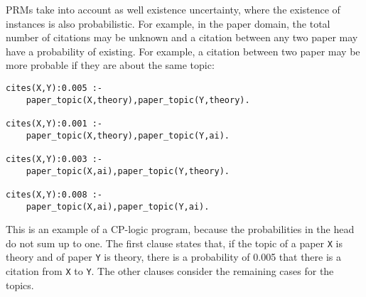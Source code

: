 \documentclass{article}
\begin{document}
PRMs take into account as well existence uncertainty, where the existence of instances is also probabilistic. For example, in the paper domain, the total number of citations may be unknown and  a citation between any two paper may have a probability of existing. For example, a citation between two paper may be more probable if they are about the same topic:
\begin{verbatim}
cites(X,Y):0.005 :- 
    paper_topic(X,theory),paper_topic(Y,theory).

cites(X,Y):0.001 :- 
    paper_topic(X,theory),paper_topic(Y,ai).

cites(X,Y):0.003 :- 
    paper_topic(X,ai),paper_topic(Y,theory).

cites(X,Y):0.008 :- 
    paper_topic(X,ai),paper_topic(Y,ai).
\end{verbatim}
This is an example of a CP-logic program, because the probabilities in the head do not sum up to one.
The first clause states that, if the topic of a paper \texttt{X} is theory and  of  paper \texttt{Y} is theory, there is a probability of 0.005 that there is a citation from \texttt{X} to \texttt{Y}. The other clauses consider the remaining cases for the topics.
\end{document}
